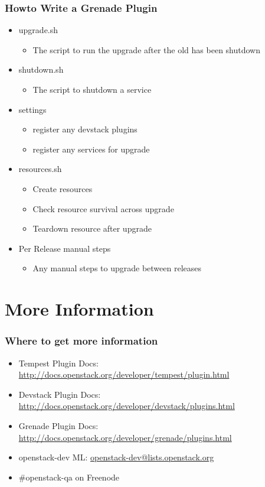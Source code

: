 \documentclass[aspectratio=169,11pt,hyperref={colorlinks=true}]{beamer}
\begin{document}
\begin{frame}
    \frametitle{Howto Write a Grenade Plugin}
    \begin{itemize}
    \item upgrade.sh
        \begin{itemize}
            \item The script to run the upgrade after the old has been shutdown
        \end{itemize}
    \item shutdown.sh
        \begin{itemize}
            \item The script to shutdown a service
        \end{itemize}
    \item settings
        \begin{itemize}
            \item register any devstack plugins
            \item register any services for upgrade
        \end{itemize}
    \item resources.sh
        \begin{itemize}
            \item Create resources
            \item Check resource survival across upgrade
            \item Teardown resource after upgrade
        \end{itemize}
    \item Per Release manual steps
        \begin{itemize}
            \item Any manual steps to upgrade between releases
        \end{itemize}
\end{itemize}
\end{frame}

\section{More Information}
\begin{frame}
\frametitle{Where to get more information}
    \begin{itemize}
        \item Tempest Plugin Docs: \href{http://docs.openstack.org/developer/tempest/plugin.html}{http://docs.openstack.org/developer/tempest/plugin.html}
        \item Devstack Plugin Docs: \href{http://docs.openstack.org/developer/devstack/plugins.html}{http://docs.openstack.org/developer/devstack/plugins.html}
        \item Grenade Plugin Docs: \href{http://docs.openstack.org/developer/grenade/plugins.html}{http://docs.openstack.org/developer/grenade/plugins.html}
        \item openstack-dev ML: \href{mailto:openstack-dev@lists.openstack.org}{openstack-dev@lists.openstack.org}
        \item \#openstack-qa on Freenode
    \end{itemize}
\end{frame}
\end{document}

